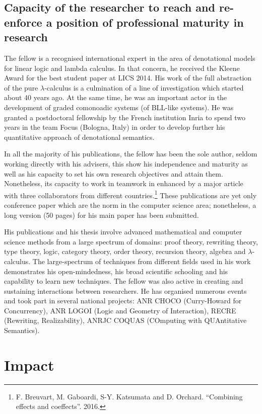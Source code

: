 \documentclass{article}[11pt]
\begin{document}
\subsection{Capacity of the researcher to reach and re-enforce a position of professional maturity in research}

The fellow is a recognised international expert in the area of denotational models for linear logic and lambda calculus. In that concern, he received the Kleene Award for the best student paper at LICS 2014. His work of the full abstraction of the pure $\lambda$-calculus is a culmination of a line of investigation which started about 40 years ago. At the same time, he was an important actor in the development of graded comonoadic systems (of BLL-like systems). He was granted a postdoctoral fellowship by the French institution Inria to spend two years in the team Focus (Bologna, Italy) in order to develop further his quantitative approach of denotational semantics.

In all the majority of his publications, the fellow has been the sole author, seldom working directly with his advisers, this show his independence and maturity as well as his capacity to set his own research objectives and attain them. Nonetheless, its capacity to work in teamwork in enhanced by a major article with three collaborators from different countries.\footnote{F. Breuvart, M. Gaboardi, S-Y. Katsumata and D. Orchard. ``Combining effects and coeffects''. 2016.} These publications are yet only conference paper which are the norm in the computer science area; nonetheless, a long version (50 pages) for his main paper has been submitted.

His publications and his thesis involve advanced mathematical and computer science methods from a large spectrum of domains: proof theory, rewriting theory, type theory, logic, category theory, order theory, recursion theory, algebra and $\lambda$-calculus. The large-spectrum of techniques from different fields used in his work demonstrates his open-mindedness, his broad scientific schooling and his capability to learn new techniques. The fellow was also active in creating and sustaining interactions between researchers. He has organised numerous events and took part in several national projects: ANR CHOCO (Curry-Howard for Concurrency), ANR LOGOI (Logic and Geometry of Interaction), RECRE (Rewriting, Realizability), ANRJC COQUAS (COmputing with QUAntitative Semantics).




\section{Impact}
\end{document}
